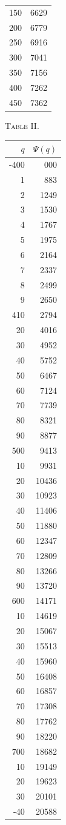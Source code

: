 \documentclass[11pt,a4paper]{article}
\begin{document}
\begin{center}
\begin{minipage}{0.42\linewidth}
\begin{tabular}{rr}
150&6629\\
200&6779\\
250&6916\\
300&7041\\
350&7156\\
400&7262\\
450&7362\\
\bottomrule
\end{tabular}
\end{minipage}\hfill
\begin{minipage}{0.42\linewidth}
\centering
\textsc{Table II.}\par
\begin{tabular}{rr}
\toprule
$q$&$\Psi(q)$\\
\midrule
-400&000\\
1&883\\
2&1249\\
3&1530\\
4&1767\\
5&1975\\
6&2164\\
7&2337\\
8&2499\\
9&2650\\
410&2794\\
20&4016\\
30&4952\\
40&5752\\
50&6467\\
60&7124\\
70&7739\\
80&8321\\
90&8877\\
500&9413\\
10&9931\\
20&10436\\
30&10923\\
40&11406\\
50&11880\\
60&12347\\
70&12809\\
80&13266\\
90&13720\\
600&14171\\
10&14619\\
20&15067\\
30&15513\\
40&15960\\
50&16408\\
60&16857\\
70&17308\\
80&17762\\
90&18220\\
700&18682\\
10&19149\\
20&19623\\
30&20101\\
-40&20588\\
\bottomrule
\end{tabular}
\end{minipage}
\end{center}
\end{document}
